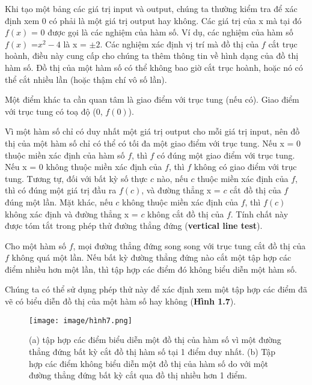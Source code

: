 \documentclass[a4paper,12pt,openany]{book}
\begin{document}
Khi tạo một bảng các giá trị input và output, chúng ta thường kiểm tra để xác định xem 0 có phải là một giá trị output hay không. Các giá trị của x mà tại đó $f(x)$ = 0 được gọi là các nghiệm của hàm số. Ví dụ, các nghiệm của hàm số $f(x)$ =\(x^2 - 4\) là x = \(\pm 2\). Các nghiệm xác định vị trí mà đồ thị của $f$ cắt trục hoành, điều này cung cấp cho chúng ta thêm thông tin về hình dạng của đồ thị hàm số. Đồ thị của một hàm số có thể không bao giờ cắt trục hoành, hoặc nó có thể cắt nhiều lần (hoặc thậm chí vô số lần).

\par
\vspace{10pt}

Một điểm khác ta cần quan tâm là giao điểm với trục tung (nếu có). Giao điểm với trục tung có toạ độ (0, $f(0)$).

\par
\vspace{10pt}

Vì một hàm số chỉ có duy nhất một giá trị output cho mỗi giá trị input, nên đồ thị của một hàm số chỉ có thể có tối đa một giao điểm với trục tung. Nếu x = 0 thuộc miền xác định của hàm số $f$, thì $f$ có đúng một giao điểm với trục tung. Nếu x = 0 không thuộc miền xác định của $f$, thì $f$ không có giao điểm với trục tung. Tương tự, đối với bất kỳ số thực $c$ nào, nếu $c$ thuộc miền xác định của $f$, thì có đúng một giá trị đầu ra $f(c)$, và đường thẳng x = $c$ cắt đồ thị của $f$ đúng một lần. Mặt khác, nếu $c$ không thuộc miền xác định của $f$, thì $f(c)$ không xác định và đường thẳng x = $c$ không cắt đồ thị của $f$. Tính chất này được tóm tắt trong phép thử đường thẳng đứng 
(\textbf{vertical line test}).
\vspace{5pt}
\begin{tcolorbox}[
    colframe=blue!10,      %
    colback=blue!5,    %
    coltitle=black,     %
    fonttitle=\bfseries,%
    title=Rule: Vertical line test    %
    ]
Cho một hàm số $f$, mọi đường thẳng đứng song song với trục tung cắt đồ thị của $f$ không quá một lần. Nếu bất kỳ đường thẳng đứng nào cắt một tập hợp các điểm nhiều hơn một lần, thì tập hợp các điểm đó không biểu diễn một hàm số. 
\end{tcolorbox}

\clearpage
Chúng ta có thể sử dụng phép thử này để xác định xem một tập hợp các điểm đã vẽ có biểu diễn đồ thị của một hàm số hay không (\textbf{Hình 1.7}).

\begin{figure}[H]
    \centering
    \texttt{[image: image/hình7.png]}
    \caption{(a) tập hợp các điểm biểu diễn một đồ thị của hàm số vì một đường thẳng đứng bất kỳ cắt đồ thị hàm số tại 1 điểm duy nhất. (b) Tập hợp các điểm không biểu diễn một đồ thị của hàm số do với một đường thẳng đứng bất kỳ cắt qua đồ thị nhiều hơn 1 điểm.}
    \label{fig:enter-label}
\end{figure}
\end{document}
